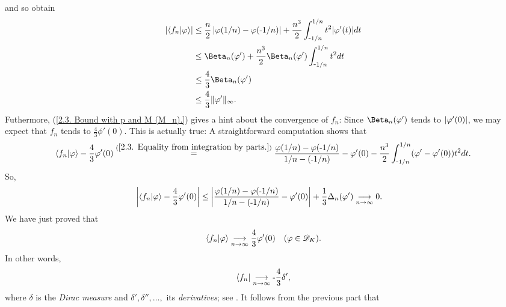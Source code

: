 %
and so obtain %
%
  \begin{align}
    \magnitude{\bra{f_n}\ket{\phi}}
    & \leq  
      \frac{n}{2}\magnitude{\phi(1/n) - \phi(\minus 1/n)}
        + 
      \frac{n^3}{2}\int_{\minus1/n}^{1/n} t^{2}\lvert\phi'(t)\rvert dt
      \\
      & \leq  
        \Beta_{n}(\phi') 
          + 
        \frac{n^3}{2} \Beta_{n}(\phi') \int_{\minus1/n}^{1/n} t^{2} dt \\
      \label{2.3. Bound with p and M (M_n).}
      & \leq 
      \frac{4}{3} \Beta_{n}(\phi') \\
      \label{2.3. Bound with p and M (concrete).}
      & \leq 
      \frac{4}{3} \| \phi' \|_\infty.
  \end{align}
%
Futhermore, %
%
  (\ref{2.3. Bound with p and M (M_n).}) %
% 
gives a hint about the convergence of $f_n$: Since %
%
  $\Beta_{n}(\phi')$ tends to $\left\lvert \varphi'(0) \right\rvert$, %
%
we may expect that %
%
  $f_n$ tends to $\frac{4}{3}\phi'(0)$. %
%
This is actually true: A straightforward computation shows that %
%
  \begin{align}
    \bra{f_n}\ket{\varphi} - \frac{4}{3}\varphi'(0)
      \overset{(\ref{2.3. Equality from integration by parts.})}{=} 
    \frac{\varphi(1/n) - \varphi(\text{\small{-}} 1/n)}{1/n - (\text{\small{-}} 1/n)}
    - \varphi'(0)
    - \frac{n^3}{2} \int_{\text{\small{-}} 1/n}^{1/n} (\varphi' - \varphi'(0)) t^{2} dt.
  \end{align}
%
So, 
%
  \begin{align}
    \left\lvert \bra{f_n}\ket{\varphi} -\frac{4}{3} \varphi'(0) \right\rvert 
      & \leq 
    \left\lvert 
      \frac{\varphi(1/n) - \varphi(\text{\small{-}} 1/n)}{1/n - (\text{\small{-}} 1/n)}
      - \varphi'(0)
     \right\rvert
    + \frac{1}{3}\Delta_{n}(\varphi') 
    \underset{n\to\infty}{\longrightarrow} 0.
  \end{align}
%
We have just proved that 
%
  \begin{align}\label{2.3. (f_n) converges to Dirac (1).}
    \bra{f_n}\ket{\phi} \tendsto{n}{\infty} %
    \frac{4}{3}\phi'(0) 
    \quad (\phi\in \mathscr{D}_K).
  \end{align}
%
In other words, 
%
  \begin{align}
    \bra{f_n} \underset{n\to\infty}{\longrightarrow}\text{\small{-}} \frac{4}{3}\delta' ,
  \end{align}
%
where $\delta$ is the \textit{Dirac measure} and 
$\delta', \delta'', \dots, $ its \textit{derivatives}; %
%
  see .
%
\newline\newline\noindent
It follows from the previous part that %
